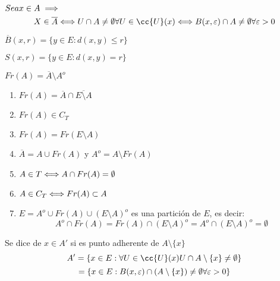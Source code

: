     \begin{definicion}
        $Sea \\ x \in A \implies$
        $$X\in \overline{A} \\ \sii\\ U \cap A \neq \emptyset \\ \forall U \in \cc{U}(x) \\ \sii\\ B(x,\varepsilon ) \cap A \neq \emptyset \\ \forall \varepsilon >0$$
    \end{definicion}

    \begin{definicion}
        $\overline{B}(x, r) = \{ y \in E : d(x,y) \leq r\}$
    \end{definicion}

    \begin{definicion}[Esfera]
        $S(x,r) = \{ y \in E: d(x,y) = r\}$
    \end{definicion}

    \begin{definicion}[Frontera]
        $Fr(A) = \overline{A} \setminus A^o$
    \end{definicion} 
    
    \begin{enumerate}
        \item $Fr(A) = \overline{A} \cap \overline{E\setminus A}$
        \item $Fr(A) \in C_T$
        \item $Fr(A) = Fr(E\setminus A)$
        \item $\overline{A} = A\cup Fr(A)$ y $A^o = A \setminus Fr(A)$
        \item $A \in T \\ \Longleftrightarrow \\ A \cap Fr(A) = \emptyset$
        \item $A \in C_T \\ \Longleftrightarrow \\ Fr(A) \subset A$
        \item $E = A^o \cup Fr(A) \cup (E\setminus A)^o$ es una partición de $E$, es decir:
        $$A^o \cap Fr(A) =  Fr(A) \cap (E\setminus A)^o = A^o \cap (E\setminus A)^o = \emptyset$$
    \end{enumerate}

    \begin{definicion}
        Se dice de $x\in A'$ si es punto adherente de $A\setminus \{x\}$
        $$A' = \{x \in E : \forall U \in \cc{U}(x) \\ U \cap A\setminus \{x\} \neq \emptyset \} $$
        $$= \{x \in E : B(x, \varepsilon) \cap (A\setminus \{x\}) \neq \emptyset \\ \forall \varepsilon >0\}$$
    \end{definicion}    


